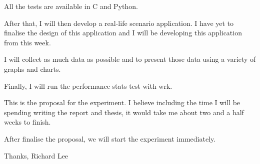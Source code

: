All the tests are available in C and Python.

After that, I will then develop a real-life scenario application. I have yet to finalise the design of this application and I will be developing this application from this week.

I will collect as much data as possible and to present those data using a variety of graphs and charts.

Finally, I will run the performance stats test with wrk.

This is the proposal for the experiment. I believe including the time I will be spending writing the report and thesis, it would take me about two and a half weeks to finish.

After finalise the proposal, we will start the experiment immediately.

Thanks,\newline
Richard Lee